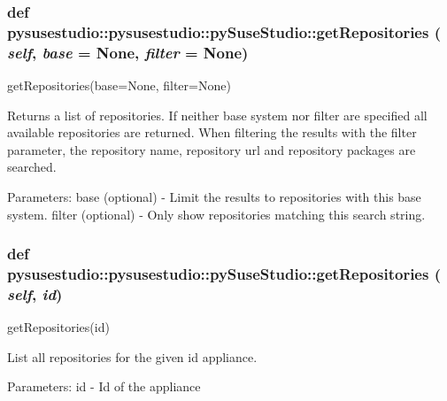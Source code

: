  \hypertarget{classpysusestudio_1_1pysusestudio_1_1py_suse_studio_a01ef6840873e9224e3afa658d1454108}{
\subsubsection[{getRepositories}]{\setlength{\rightskip}{0pt plus 5cm}def pysusestudio::pysusestudio::pySuseStudio::getRepositories ( {\em self}, \/   {\em base} = {\ttfamily None}, \/   {\em filter} = {\ttfamily None})}}
\label{classpysusestudio_1_1pysusestudio_1_1py_suse_studio_a01ef6840873e9224e3afa658d1454108}
\begin{DoxyVerb}getRepositories(base=None, filter=None)

        Returns a list of repositories. If neither base system nor filter are specified all available repositories 
        are returned. 
        When filtering the results with the filter parameter, the repository name, repository url and repository 
        packages are searched.
        
            Parameters:
base (optional) - Limit the results to repositories with this base system. 
filter (optional) - Only show repositories matching this search string.

\end{DoxyVerb}
 \hypertarget{classpysusestudio_1_1pysusestudio_1_1py_suse_studio_a01ef6840873e9224e3afa658d1454108}{
\subsubsection[{getRepositories}]{\setlength{\rightskip}{0pt plus 5cm}def pysusestudio::pysusestudio::pySuseStudio::getRepositories ( {\em self}, \/   {\em id})}}
\label{classpysusestudio_1_1pysusestudio_1_1py_suse_studio_a01ef6840873e9224e3afa658d1454108}
\begin{DoxyVerb}getRepositories(id)

        List all repositories for the given id appliance.  
            
            Parameters:
id - Id of the appliance

\end{DoxyVerb}
